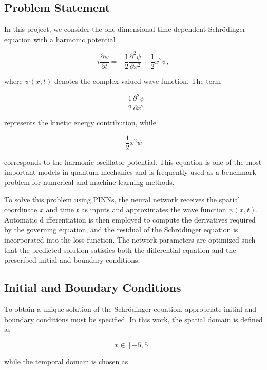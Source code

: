 \documentclass[11pt]{article}
\begin{document}
\subsection{Problem Statement}

In this project, we consider the one-dimensional time-dependent 
Schrödinger equation with a harmonic potential

\begin{equation}
i\frac{\partial \psi}{\partial t}
=
-\frac{1}{2}\frac{\partial^2 \psi}{\partial x^2}
+
\frac{1}{2}x^2\psi,
\end{equation}

where $\psi(x,t)$ denotes the complex-valued wave function. The term

\begin{equation}
-\frac{1}{2}\frac{\partial^2 \psi}{\partial x^2}
\end{equation}

represents the kinetic energy contribution, while

\begin{equation}
\frac{1}{2}x^2\psi
\end{equation}

corresponds to the harmonic oscillator potential. 
This equation is one of the most important models in 
quantum mechanics and is frequently used as a benchmark 
problem for numerical and machine learning methods.

To solve this problem using PINNs, the neural 
network receives the spatial coordinate 
$x$ and time $t$ as inputs and approximates 
the wave function $\psi(x,t)$. Automatic d
ifferentiation is then employed to compute 
the derivatives required by the governing equation, 
and the residual of the Schrödinger equation is 
incorporated into the loss function. The network 
parameters are optimized such that the predicted 
solution satisfies both the differential equation 
and the prescribed initial and boundary conditions.
\subsection{Initial and Boundary Conditions}
To obtain a unique solution of the Schrödinger equation, 
appropriate initial and boundary conditions must be specified.
In this work, the spatial domain is defined as

\begin{equation}
    x \in [-5,5]
\end{equation}


while the temporal domain is chosen as
\end{document}
